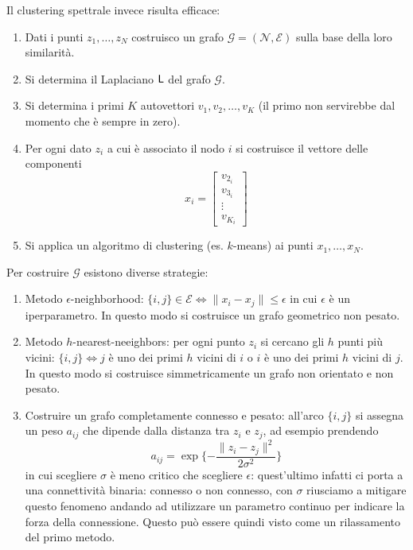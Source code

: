Il clustering spettrale invece risulta efficace:

\begin{enumerate}
\item Dati i punti $z_1, \dots, z_N$ costruisco un grafo $\mathcal{G} = (\mathcal{N}, \mathcal{E})$ sulla base della loro similarit\`a.
\item Si determina il Laplaciano $\mathsf{L}$ del grafo $\mathcal{G}$.
\item Si determina i primi $K$ autovettori $v_1, v_2, \dots, v_K$ (il primo non servirebbe dal momento che \`e sempre in zero).
\item Per ogni dato $z_i$ a cui \`e associato il nodo $i$ si costruisce il vettore delle componenti
    \begin{equation}
    x_i = \begin{bmatrix}
    v_{2_i} \\
    v_{3_i} \\
    \vdots \\
    v_{K_i}
    \end{bmatrix}
    \end{equation}
\item Si applica un algoritmo di clustering (es. $k$-means) ai punti $x_1, \dots, x_N$.
\end{enumerate}
Per costruire $\mathcal{G}$ esistono diverse strategie:
\begin{enumerate}
\item Metodo $\epsilon$-neighborhood: $\{i,j\} \in \mathcal{E} \iff \| x_i - x_j \| \leq \epsilon$ in cui $\epsilon$ \`e un iperparametro. In questo modo si costruisce un grafo geometrico non pesato.
\item Metodo $h$-nearest-neeighbors: per ogni punto $z_i$ si cercano gli $h$ punti pi\`u vicini: $\{i,j \} \iff j$ \`e uno dei primi $h$ vicini di $i$ o $i$ \`e uno dei primi $h$ vicini di $j$. In questo modo si costruisce simmetricamente un grafo non orientato e non pesato.
\item Costruire un grafo completamente connesso e pesato: all'arco $\{i,j\}$ si assegna un peso $a_{ij}$ che dipende dalla distanza tra $z_i$ e $z_j$, ad esempio prendendo 
   \begin{equation}
   a_{ij} = \exp \Big \{ {-\frac{\| z_i - z_j \|^2}{2\sigma^2}} \Big \}
   \end{equation}
   in cui scegliere $\sigma$ \`e meno critico che scegliere $\epsilon$: quest'ultimo infatti ci porta a una connettivit\`a binaria: connesso o non connesso, con $\sigma$ riusciamo a mitigare questo fenomeno andando ad utilizzare un parametro continuo per indicare la forza della connessione. Questo pu\`o essere quindi visto come un rilassamento del primo metodo.
\end{enumerate}

